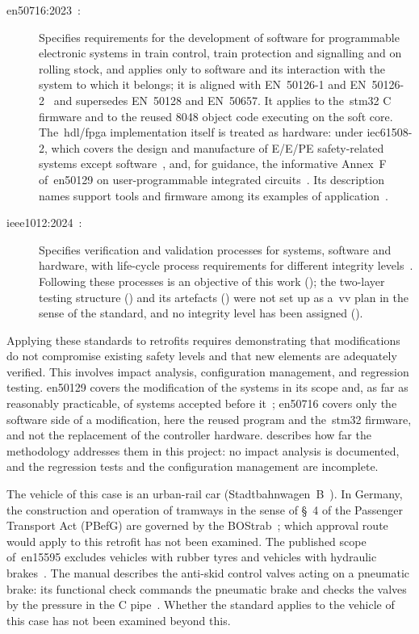 \begin{description}
	\item[\gls{en50716}:2023~\cite{en50716_2023}:] Specifies requirements for the development of software for programmable electronic systems in train control, train protection and signalling and on rolling stock, and applies only to software and its interaction with the system to which it belongs; it is aligned with \mbox{EN~50126-1} and \mbox{EN~50126-2}~\cite{en50716_2023} and supersedes EN~50128 and EN~50657. It applies to the~\gls{stm32} C firmware and to the reused 8048 object code executing on the soft core. The~\gls{hdl}/\gls{fpga} implementation itself is treated as hardware: under \mbox{\gls{iec61508}-2}, which covers the design and manufacture of E/E/PE safety-related systems except software~\cite{iec61508_2_2010}, and, for guidance, the informative Annex~F of~\gls{en50129} on user-programmable integrated circuits~\cite{en50129_2018}. Its description names support tools and firmware among its examples of application~\cite{en50716_2023}.
	\item[\gls{ieee1012}:2024~\cite{ieee1012_2024}:] Specifies verification and validation processes for systems, software and hardware, with life-cycle process requirements for different integrity levels~\cite{ieee1012_2024}. Following these processes is an objective of this work (); the two-layer testing structure () and its artefacts () were not set up as a~\gls{vv} plan in the sense of the standard, and no integrity level has been assigned ().
\end{description}
Applying these standards to retrofits requires demonstrating that modifications do not compromise existing safety levels and that new elements are adequately verified. This involves impact analysis, configuration management, and regression testing. \gls{en50129} covers the modification of the systems in its scope and, as far as reasonably practicable, of systems accepted before it~\cite{en50129_2018}; \gls{en50716} covers only the software side of a modification, here the reused program and the~\gls{stm32} firmware, and not the replacement of the controller hardware.  describes how far the methodology addresses them in this project: no impact analysis is documented, and the regression tests and the configuration management are incomplete.

The vehicle of this case is an urban-rail car (Stadtbahnwagen~B~\cite{rexroth1992wsp}). In Germany, the construction and operation of tramways in the sense of \S~4 of the Passenger Transport Act (PBefG) are governed by the BOStrab~\cite[\S~1]{bostrab}; which approval route would apply to this retrofit has not been examined. The published scope of~\gls{en15595} excludes vehicles with rubber tyres and vehicles with hydraulic brakes~\cite{en15595_2018}. The manual describes the anti-skid control valves acting on a pneumatic brake: its functional check commands the pneumatic brake and checks the valves by the pressure in the C pipe~\cite[Blatt~17/25, 18/25]{rexroth1992wsp}. Whether the standard applies to the vehicle of this case has not been examined beyond this.

